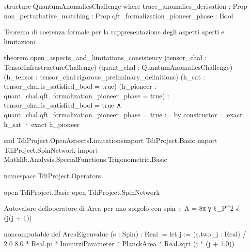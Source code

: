 \documentclass{article}
\newenvironment{Shaded}{%
  \begin{snugshade}%
}{%
  \end{snugshade}%
}%
\newenvironment{Highlighting}{%
}{%
}%
\newcommand{\NormalTok}[1]{#1}
\begin{document}
\begin{Shaded}
\begin{Highlighting}[]
\NormalTok{structure QuantumAnomaliesChallenge where}
\NormalTok{  trace\_anomalies\_derivation : Prop}
\NormalTok{  non\_perturbative\_matching : Prop}
\NormalTok{  qft\_formalization\_pioneer\_phase : Bool}

\end{Highlighting}
\end{Shaded}

Teorema di coerenza formale per la rappresentazione degli aspetti aperti
e limitazioni.

\begin{Shaded}
\begin{Highlighting}[]
\NormalTok{theorem open\_aspects\_and\_limitations\_consistency }
\NormalTok{    (tensor\_chal : TensorInfrastructureChallenge) }
\NormalTok{    (quant\_chal : QuantumAnomaliesChallenge) }
\NormalTok{    (h\_tensor : tensor\_chal.rigorous\_preliminary\_definitions)}
\NormalTok{    (h\_sat : tensor\_chal.is\_satisfied\_bool = true)}
\NormalTok{    (h\_pioneer : quant\_chal.qft\_formalization\_pioneer\_phase = true) :}
\NormalTok{    tensor\_chal.is\_satisfied\_bool = true ∧ quant\_chal.qft\_formalization\_pioneer\_phase = true := by}
\NormalTok{  constructor}
\NormalTok{  · exact h\_sat}
\NormalTok{  · exact h\_pioneer}

\NormalTok{end TdiProject.OpenAspectsLimitationsimport TdiProject.Basic}
\NormalTok{import TdiProject.SpinNetwork}
\NormalTok{import Mathlib.Analysis.SpecialFunctions.Trigonometric.Basic}

\NormalTok{namespace TdiProject.Operators}

\NormalTok{open TdiProject.Basic}
\NormalTok{open TdiProject.SpinNetwork}

\end{Highlighting}
\end{Shaded}

Autovalore dell\textquotesingle operatore di Area per uno spigolo con
spin j: A = 8π γ ℓ\_P\^{}2 √ (j(j + 1))

\begin{Shaded}
\begin{Highlighting}[]
\NormalTok{noncomputable def AreaEigenvalue (s : Spin) : Real :=}
\NormalTok{  let j := (s.two\_j : Real) / 2.0}
\NormalTok{  8.0 * Real.pi * ImmirziParameter * PlanckArea * Real.sqrt (j * (j + 1.0))}

\end{Highlighting}
\end{Shaded}
\end{document}
